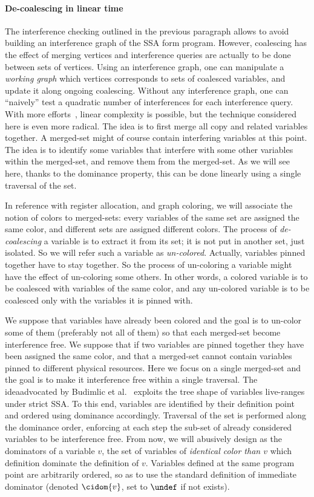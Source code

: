 \paragraph{De-coalescing in linear time}
The interference checking outlined in the previous paragraph allows to avoid building an interference graph of the SSA form program. However, coalescing has the effect of merging vertices and interference queries are actually to be done between sets of vertices. Using an interference graph, one can manipulate a \emph{working graph} which vertices corresponds to sets of coalesced variables, and update it along ongoing coalescing. Without any interference graph, one can ``naively'' test a quadratic number of interferences for each interference query. With more efforts\ifhab~\cite{Boissinot09}\fi, linear complexity is possible, but the technique considered here is even more radical. The idea is to first merge all copy and \phifun related variables together. A merged-set might of course contain interfering variables at this point. The idea is to identify some variables that interfere with some other variables within the merged-set, and remove them from the merged-set. As we will see here, thanks to the dominance property, this can be done linearly using a single traversal of the set.

In reference with register allocation, and graph coloring, we will associate the notion of colors to merged-sets: every variables of the same set are assigned the same color, and different sets are assigned different colors. The process of \emph{de-coalescing} a variable is to extract it from its set; it is not put in another set, just isolated. So we will refer such a variable as \emph{un-colored}. Actually, variables pinned together have to stay together. So the process of un-coloring a variable might have the effect of un-coloring some others. In other words, a colored variable is to be coalesced with variables of the same color, and any un-colored variable is to be coalesced only with the variables it is pinned with. 


We suppose that variables have already been colored and the goal is to un-color some of them (preferably not all of them) so that each merged-set become interference free. We suppose that if two variables are pinned together they have been assigned the same color, and that a merged-set cannot contain variables pinned to different physical resources. Here we focus on a single merged-set and the goal is to make it interference free within a single traversal. The idea\ifhab advocated by Budimlic et al.~\cite{Budimlic02} \fi exploits the tree shape of variables live-ranges under strict SSA. To this end, variables are identified by their definition point and ordered using dominance accordingly. Traversal of the set is performed along the dominance order, enforcing at each step the sub-set of already considered variables to be interference free. From now, we will abusively design as the dominators of a variable $v$, the set of variables of \emph{identical color than $v$} which definition dominate the definition of $v$. Variables defined at the same program point are arbitrarily ordered, so as to use the standard definition of immediate dominator (denoted $\cidom{v}$, set to $\undef$ if not exists).


